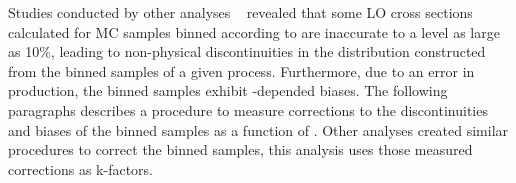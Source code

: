 Studies conducted by other analyses ~\cite{RobXS} revealed that some LO cross
sections calculated for MC samples binned according to \partonht are
inaccurate to a level as large as 10\%, leading to non-physical discontinuities 
in the \partonht distribution constructed from the binned samples of a given process.
Furthermore, due to an error in production, the \wlnu \; \scalht binned samples exhibit 
\scalht-depended biases. The following paragraphs describes a procedure to measure 
corrections to the discontinuities and biases of the \wlnu \; \partonht binned samples 
as a function of \scalht. Other analyses created similar procedures to correct 
the \zmumu \; \partonht binned samples, this analysis uses those measured corrections 
as k-factors.  

\begin{figure}[h!t]
  \begin{center}
     \\
     \\

\end{center}
\end{figure}
